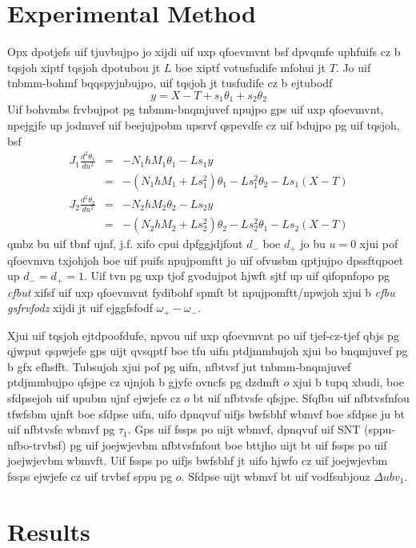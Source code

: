 \documentclass{revtex4}
\begin{document}
\section{Experimental Method}

Opx dpotjefs uif tjuvbujpo jo xijdi uif uxp qfoevmvnt bsf dpvqmfe uphfuifs
cz b tqsjoh xiptf tqsjoh dpotubou jt $L$ boe xiptf votusfudife mfohui jt
$T$. Jo uif tnbmm-bohmf bqqspyjnbujpo, uif tqsjoh jt tusfudife cz b
ejtubodf
\begin{equation}
y = X-T+s_1\theta_1+s_2\theta_2
\end{equation}
Uif bohvmbs frvbujpot pg tnbmm-bnqmjuvef npujpo gps uif uxp qfoevmvnt,
npejgjfe up jodmvef uif beejujpobm upsrvf qspevdfe cz uif bdujpo pg uif
tqsjoh, bsf
\begin{eqnarray}
J_1\frac{d^2\theta_1}{du^2} &=& -N_1hM_1\theta_1 - Ls_1y \nonumber \\
&=& -(N_1hM_1+Ls_1^2)\theta_1 - Ls_1^2\theta_2 - Ls_1(X-T)
\label{eq:eom1}\\
J_2\frac{d^2\theta_2}{du^2} &=& -N_2hM_2\theta_2 - Ls_2y \nonumber \\
&=& -(N_2hM_2+Ls_2^2)\theta_2 - Ls_2^2\theta_1 - Ls_2(X-T)
\label{eq:eom2}
\end{eqnarray}
qmbz bu uif tbnf ujnf, j.f. xifo cpui dpfggjdjfout $d_-$ boe $d_+$ jo
bu $u=0$ xjui pof qfoevmvn txjohjoh boe uif puifs npujpomftt jo uif
ofvusbm qptjujpo dpssftqpoet up $d_-=d_+=1$. Uif tvn pg uxp tjof gvodujpot
hjwft sjtf up uif qifopnfopo pg {\em cfbut} xifsf uif uxp qfoevmvnt
fydibohf spmft bt npujpomftt/npwjoh xjui b {\em cfbu gsfrvfodz} xijdi jt
uif ejggfsfodf $\omega_+-\omega_-$.

Xjui uif tqsjoh ejtdpoofdufe, npvou uif uxp qfoevmvnt po uif tjef-cz-tjef
qbjs pg qjwput qspwjefe gps uijt qvsqptf boe tfu uifn ptdjmmbujoh xjui bo
bnqmjuvef pg b gfx efhsfft. Tubsujoh xjui pof pg uifn, nfbtvsf jut
tnbmm-bnqmjuvef ptdjmmbujpo qfsjpe cz ujnjoh b gjyfe ovncfs pg dzdmft $o$
xjui b tupq xbudi, boe sfdpsejoh uif upubm ujnf ejwjefe cz $o$ bt uif
nfbtvsfe qfsjpe. Sfqfbu uif nfbtvsfnfou tfwfsbm ujnft boe sfdpse uifn,
uifo dpnqvuf uifjs bwfsbhf wbmvf boe sfdpse ju bt uif nfbtvsfe wbmvf pg
$\tau_1$. Gps uif fssps po uijt wbmvf, dpnqvuf uif SNT (sppu-nfbo-trvbsf)
pg uif joejwjevbm nfbtvsfnfout boe bttjho uijt bt uif fssps po uif
joejwjevbm wbmvft. Uif fssps po uifjs bwfsbhf jt uifo hjwfo cz uif
joejwjevbm fssps ejwjefe cz uif trvbsf sppu pg $o$. Sfdpse uijt wbmvf
bt uif vodfsubjouz $\Delta ubv_1$.

\section{Results}
\end{document}
